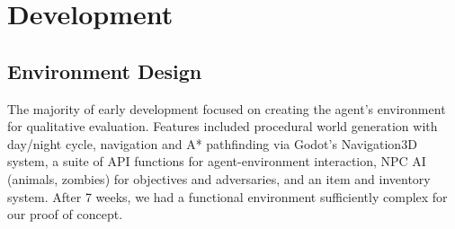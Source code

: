 \documentclass{article}
\begin{document}
\section{Development}
\subsection{Environment Design}
The majority of early development focused on creating the agent's environment for qualitative evaluation.
Features included procedural world generation with day/night cycle, navigation and A* pathfinding via Godot's Navigation3D system, a suite of API functions for agent-environment interaction, NPC AI (animals, zombies) for objectives and adversaries, and an item and inventory system.
After 7 weeks, we had a functional environment sufficiently complex for our proof of concept.
\end{document}
